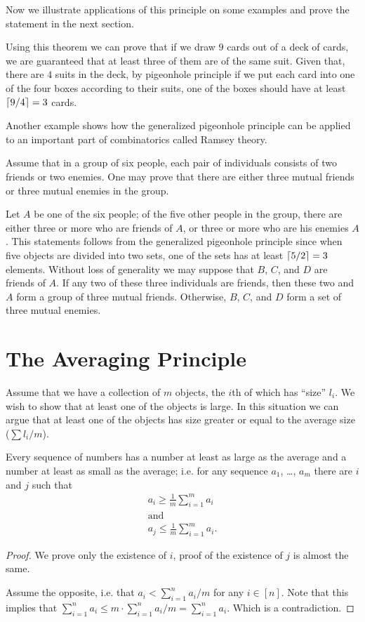 Now we illustrate applications of this principle on some examples and prove the
statement in the next section.

Using this theorem we can prove that if we draw $9$ cards out of a deck of
cards, we are guaranteed that at least three of them are of the same suit.
Given that, there are $4$ suits in the deck, by pigeonhole principle if we put each card into
one of the four boxes according to their suits, one of the boxes should have
at least $\left\lceil {9 / 4} \right\rceil = 3$ cards.

Another example shows how the generalized pigeonhole principle can be applied
to an important part of combinatorics called Ramsey theory.

Assume that in a group of six people, each pair of individuals consists of two
friends or two enemies. One may prove that there are either three mutual
friends or three mutual enemies in the group.

Let $A$ be one of the six people; of the five other people in the group, there
are either three or more who are friends of $A$, or three or more who are
his enemies $A$. This statements follows from the generalized pigeonhole
principle since when five objects are divided into two sets, one of the sets
has at least $\left\lceil {5 / 2} \right\rceil = 3$ elements. Without loss of generality we may
suppose that $B$, $C$, and $D$ are friends of $A$. If any two of these three
individuals are friends, then these two and $A$ form a group of three mutual
friends. Otherwise, $B$, $C$, and $D$ form a set of three mutual enemies.

\section{The Averaging Principle}
Assume that we have a collection of $m$ objects, the $i$th of which has
``size'' $l_i$. We wish to show that at least one of the objects is large.
In this situation we can argue that at least one of the objects has size
greater or equal to the average size ($\sum l_i / m$).
\begin{theorem}
\label{theorem:averaging-principle}
  Every sequence of numbers has a number at least as large as the average and a
  number at least as small as the average; i.e. for any sequence $a_1$, \dots,
  $a_m$ there are $i$ and $j$ such that
  \begin{gather*}
    a_i \ge \frac{1}{m} \sum_{i = 1}^m a_i \\
    \text{and} \\
    a_j \le \frac{1}{m} \sum_{i = 1}^m a_i.
  \end{gather*}
\end{theorem}
\begin{proof}
  We prove only the existence of $i$, proof of the existence of $j$ is almost
  the same.

  Assume the opposite, i.e. that $a_i < \sum_{i = 1}^n a_i / m$
  for any $i \in [n]$. Note that this implies that
  $\sum_{i = 1}^n a_i \le m \cdot \sum_{i = 1}^n a_i / m = \sum_{i = 1}^n a_i$.
  Which is a contradiction.
\end{proof}

